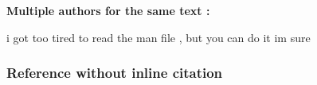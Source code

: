 

\textbf{Multiple authors for the same text :}

i got too tired to read the man file , but you can do it im sure

\subsubsectionend


\subsubsection{Reference without inline citation}
\label{sssec:reference_without_inline_citation}

\nocite{lipsum}

\subsubsectionend
\sectionend

